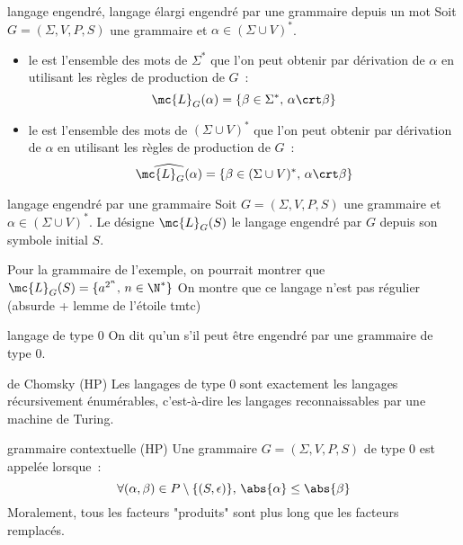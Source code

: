 \begin{adjustwidth}{-3cm}{-3cm}
\begin{definition}{}{langage engendré, langage élargi engendré par une grammaire depuis un mot}
    Soit $G = (\Sigma, V, P , S)$ une grammaire et $\alpha \in (\Sigma\cup V)^*$.
    \begin{itemize}
        \item le  est l'ensemble des mots de $\Sigma^*$ que l'on peut obtenir par dérivation de $\alpha$ en utilisant les règles de production de $G$~:
        $$\mc{L}_G(\alpha) = \{\beta \in \Sigma^*,\, \alpha \crt \beta\}$$
        \item le  est l'ensemble des mots de $(\Sigma \cup V)^*$ que l'on peut obtenir par dérivation de $\alpha$ en utilisant les règles de production de $G$~:
        $$\widehat{\mc{L}_G(\alpha)} = \{\beta \in (\Sigma \cup V)^*,\, \alpha \crt \beta\}$$
    \end{itemize}
\end{definition}

\begin{definition}{}{langage engendré par une grammaire}
    Soit $G = (\Sigma, V, P , S)$ une grammaire et $\alpha \in (\Sigma\cup V)^*$. Le  désigne $\mc{L}_G(S)$ le langage engendré par $G$ depuis son symbole initial $S$.
\end{definition}

\begin{exemple}{}{}
    Pour la grammaire de l'exemple, on pourrait montrer que $\mc{L}_G(S) = \{a^{2^n},\, n \in \N^*\}$
    On montre que ce langage n'est pas régulier (absurde + lemme de l'étoile tmtc)
\end{exemple}

\begin{definition}{}{langage de type 0}
    On dit qu'un  s'il peut être engendré par une grammaire de type 0.
\end{definition}

\begin{theoreme}{}{de Chomsky (HP)}
    Les langages de type 0 sont exactement les langages récursivement énumérables, c'est-à-dire les langages reconnaissables par une machine de Turing.
\end{theoreme}

\begin{definition}{}{grammaire contextuelle (HP)}
    Une grammaire $G=(\Sigma, V,P,S)$ de type 0 est appelée  lorsque~:
    $$\forall (\alpha,\beta) \in P \setminus \{(S,\epsilon)\},\, \abs{\alpha} \leq \abs{\beta}$$
    Moralement, tous les facteurs "produits" sont plus long que les facteurs remplacés.
\end{definition}


\end{adjustwidth}
